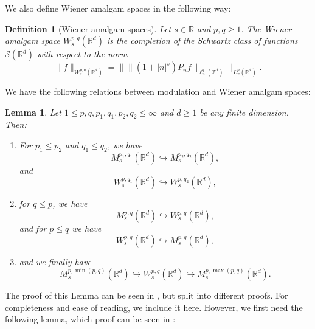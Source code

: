 \documentclass[letterpaper, 11pt,  reqno]{amsart}
\newtheorem{lemma}[theorem]{Lemma}
\newtheorem{definition}[theorem]{Definition}
\newcommand{\1}{\hspace{0.5mm}\text{I}\hspace{0.5mm}}
\newcommand{\noi}{\noindent}
\newcommand{\Z}{\mathbb{Z}}
\newcommand{\R}{\mathbb{R}}
\newcommand{\embeds}{\hookrightarrow}
\numberwithin{equation}{section}
\numberwithin{theorem}{section}
\newcommand{\abs}[1]{\lvert#1\rvert}
\begin{document}
\noi We also define Wiener amalgam spaces in the following way:

\begin{definition}[Wiener amalgam spaces] \rm
Let $s \in \R$ and $p,q \geq 1$. The Wiener amalgam space $W^{p,q}_s (\R^d)$ is the completion of the Schwartz class of functions $\mathcal{S} ( \R^d)$ with respect to the norm
$$
\| f \|_{W^{p,q}_s (\R^d)} = \big\| \|(1 +  \abs{n}^s)P_n f \|_{\ell^q_n (\Z^d)} \big\|_{L^p_x (\R^d)}.
$$
\end{definition}


\noi We have the following relations between modulation and Wiener amalgam spaces:



\begin{lemma}
\label{LEM:RelationsMW}
Let $1 \leq p,q, p_1, q_1, p_2, q_2 \leq \infty$ and $d \geq 1$ be any finite dimension. Then:
\begin{enumerate}
	\item For $p_1 \leq p_2$ and $q_1 \leq q_2$, we have 
\begin{equation}
\label{EQ:EmbeddingsM}
M^{p_1, q_1}_s (\R^d) \embeds M^{p_2, q_2}_s (\R^d),
\end{equation}
\noi and
\begin{equation}
\label{EQ:EmbeddingsW}
W^{p, q_1}_s (\R^d) \embeds W^{p, q_2}_s (\R^d),
\end{equation}
	\item for $q\leq p$, we have
\begin{equation}
\label{EQ:EmbeddingMintoW}
M^{p, q}_s (\R^d) \embeds W^{p, q}_s (\R^d),
\end{equation}
	\noi and for $p \leq q$ we have
\begin{equation}
\label{EQ:EmbeddingWintoM}
W^{p, q}_s (\R^d) \embeds M^{p, q}_s (\R^d),
\end{equation}
	\item and we finally have 
\begin{equation}
\label{EQ:RelationsMandW_end}
M^{p, \min(p,q)}_s (\R^d) \embeds W^{p, q}_s (\R^d) \embeds M^{p, \max(p,q)}_s (\R^d).
\end{equation}
\end{enumerate}
\end{lemma}

\noi The proof of this Lemma can be seen in \cite{BH}, but split into different proofs. For completeness and ease of reading, we include it here. However, we first need the following lemma, which proof can be seen in \cite[Lemma 6.1] {WHHG}:
\end{document}
